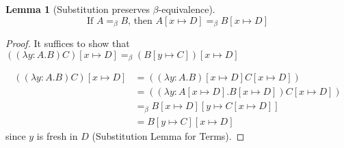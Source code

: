 \documentclass{article}
\newtheorem{lemma}{Lemma}
\begin{document}
\begin{lemma}[Substitution preserves $\beta$-equivalence]
  \[\text{If $A=_\beta B$, then $A[x\mapsto D]=_\beta B[x\mapsto D]$}\]
\end{lemma}
\begin{proof}
  It suffices to show that $((\lambda y:A.B)C)[x\mapsto D]=_\beta(B[y\mapsto C])[x\mapsto D]$

  \begin{align*}
  ((\lambda y:A.B)C)[x\mapsto D]&=((\lambda y:A.B)[x\mapsto D]C[x\mapsto D])\\
    &=((\lambda y:A[x\mapsto D].B[x\mapsto D])C[x\mapsto D])\\
    &=_\beta B[x\mapsto D][y\mapsto C[x\mapsto D]]\\
    &=B[y\mapsto C][x\mapsto D]
  \end{align*}
  since $y$ is fresh in $D$ (Substitution Lemma for Terms).
\end{proof}
\end{document}
